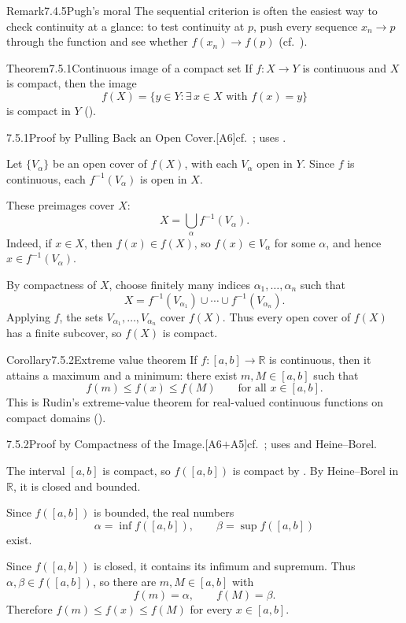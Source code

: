 \documentclass[main.tex]{subfiles}
\begin{document}
\begin{ObjL}{Remark}{7.4.5}{Pugh's moral}
The sequential criterion is often the easiest way to check continuity at a glance: to test
continuity at $p$, push every sequence $x_n\to p$ through the function and see whether
$f(x_n)\to f(p)$ (cf.\ ).
\end{ObjL}


\begin{Obj}{Theorem}{7.5.1}{Continuous image of a compact set}
If $f:X\to Y$ is continuous and $X$ is compact, then the image
\[
  f(X)=\{y\in Y:\exists\,x\in X\text{ with }f(x)=y\}
\]
is compact in $Y$ ().
\end{Obj}
\begin{Prf}{7.5.1}{Proof by Pulling Back an Open Cover.}{[A6]\quad cf.\ ; uses .}
\item Let $\{V_\alpha\}$ be an open cover of $f(X)$, with each $V_\alpha$ open in $Y$.
  Since $f$ is continuous, each $f^{-1}(V_\alpha)$ is open in $X$.
\item These preimages cover $X$:
  \[
    X=\bigcup_\alpha f^{-1}(V_\alpha).
  \]
  Indeed, if $x\in X$, then $f(x)\in f(X)$, so $f(x)\in V_\alpha$ for some $\alpha$, and hence
  $x\in f^{-1}(V_\alpha)$.
\item By compactness of $X$, choose finitely many indices
  $\alpha_1,\dots,\alpha_n$ such that
  \[
    X=f^{-1}(V_{\alpha_1})\cup\cdots\cup f^{-1}(V_{\alpha_n}).
  \]
  Applying $f$, the sets $V_{\alpha_1},\dots,V_{\alpha_n}$ cover $f(X)$. Thus every open cover of
  $f(X)$ has a finite subcover, so $f(X)$ is compact.
\end{Prf}

\begin{Obj}{Corollary}{7.5.2}{Extreme value theorem}
If $f:[a,b]\to\mathbb R$ is continuous, then it attains a maximum and a minimum: there exist
$m,M\in[a,b]$ such that
\[
  f(m)\le f(x)\le f(M)\qquad\text{for all }x\in[a,b].
\]
This is Rudin's extreme-value theorem for real-valued continuous functions on compact
domains ().
\end{Obj}
\begin{Prf}{7.5.2}{Proof by Compactness of the Image.}{[A6$+$A5]\quad cf.\ ; uses  and Heine--Borel.}
\item The interval $[a,b]$ is compact, so $f([a,b])$ is compact by . By
  Heine--Borel in $\mathbb R$, it is closed and bounded.
\item Since $f([a,b])$ is bounded, the real numbers
  \[
    \alpha=\inf f([a,b]),
    \qquad
    \beta=\sup f([a,b])
  \]
  exist.
\item Since $f([a,b])$ is closed, it contains its infimum and supremum. Thus
  $\alpha,\beta\in f([a,b])$, so there are $m,M\in[a,b]$ with
  \[
    f(m)=\alpha,
    \qquad
    f(M)=\beta .
  \]
  Therefore $f(m)\le f(x)\le f(M)$ for every $x\in[a,b]$.
\end{Prf}
\end{document}

